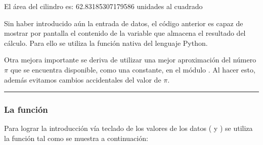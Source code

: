 \documentclass[letterpaper,10pt,english]{sphinxmanual}
\begin{document}
\begin{sphinxVerbatim}[commandchars=\\\{\}]
El área del cilindro es:
62.83185307179586 unidades al cuadrado
\end{sphinxVerbatim}

Sin haber introducido aún la entrada de datos, el código anterior es capaz de mostrar por pantalla el contenido de la variable que almacena el resultado del cálculo. Para ello se utiliza la función  nativa del lenguaje Python.

Otra mejora importante se deriva de utilizar una mejor aproximación del número \(\pi\) que se encuentra disponible, como una constante, en el módulo . Al hacer esto, además evitamos cambios accidentales del valor de \(\pi\).


\bigskip\hrule\bigskip





\subsubsection{La función }
\label{\detokenize{Entrada_salida:la-funcion-input}}
Para lograr la introducción vía teclado de los valores de los datos ( y ) se utiliza la función  tal como se muestra a continuación:

\begin{sphinxVerbatim}[commandchars=\\\{\}]
   

  
  


  

  
  
    

 
\end{sphinxVerbatim}
\end{document}
